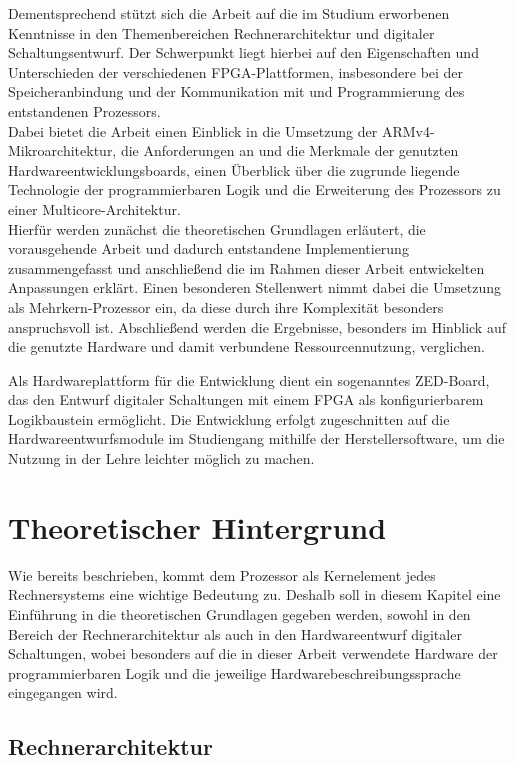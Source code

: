 \documentclass[11pt,a4paper,titlepage]{article}
\begin{document}
Dementsprechend stützt sich die Arbeit auf die im Studium erworbenen Kenntnisse in den Themenbereichen Rechnerarchitektur und digitaler Schaltungsentwurf. Der Schwerpunkt liegt hierbei auf den Eigenschaften und Unterschieden der verschiedenen FPGA-Plattformen, insbesondere bei der Speicheranbindung und der Kommunikation mit und Programmierung des entstandenen Prozessors.\\

Dabei bietet die Arbeit einen Einblick in die Umsetzung der ARMv4-Mikroarchitektur, die Anforderungen an und die Merkmale der genutzten Hardwareentwicklungsboards, einen Überblick über die zugrunde liegende Technologie der programmierbaren Logik und die Erweiterung des Prozessors zu einer Multicore-Architektur.\\

Hierfür werden zunächst die theoretischen Grundlagen erläutert, die vorausgehende Arbeit und dadurch entstandene Implementierung zusammengefasst und anschließend die im Rahmen dieser Arbeit entwickelten Anpassungen erklärt. Einen besonderen Stellenwert nimmt dabei die Umsetzung als Mehrkern-Prozessor ein, da diese durch ihre Komplexität besonders anspruchsvoll ist. Abschließend werden die Ergebnisse, besonders im Hinblick auf die genutzte Hardware und damit verbundene Ressourcennutzung, verglichen.

Als Hardwareplattform für die Entwicklung dient ein sogenanntes ZED-Board, das den Entwurf digitaler Schaltungen mit einem FPGA als konfigurierbarem Logikbaustein ermöglicht. Die Entwicklung erfolgt zugeschnitten auf die Hardwareentwurfsmodule im Studiengang mithilfe der Herstellersoftware, um die Nutzung in der Lehre leichter möglich zu machen.

\newpage
\section{Theoretischer Hintergrund}

Wie bereits beschrieben, kommt dem Prozessor als Kernelement jedes Rechnersystems eine wichtige Bedeutung zu. Deshalb soll in diesem Kapitel eine Einführung in die theoretischen Grundlagen gegeben werden, sowohl in den Bereich der Rechnerarchitektur als auch in den Hardwareentwurf digitaler Schaltungen, wobei besonders auf die in dieser Arbeit verwendete Hardware der programmierbaren Logik und die jeweilige Hardwarebeschreibungssprache eingegangen wird.

\subsection{Rechnerarchitektur}
\end{document}
